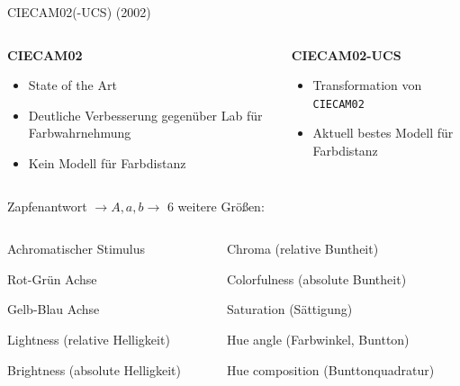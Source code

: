 \documentclass[aspectratio=1610, 9pt]{beamer}
\begin{document}
\begin{frame}[c]{CIECAM02(-UCS) (2002)}
  \begin{columns}[t, onlytextwidth]%
    \begin{column}{0.45\textwidth}%
      \textbf{\Large CIECAM02}

      \begin{itemize}
        \item State of the Art
        \item Deutliche Verbesserung gegenüber Lab für Farbwahrnehmung
        \item Kein Modell für Farbdistanz
      \end{itemize}
    \end{column}
    \begin{column}{0.45\textwidth}%
      \textbf{\Large CIECAM02-UCS}
      \begin{itemize}
        \item Transformation von \texttt{CIECAM02}  
        \item Aktuell bestes Modell für Farbdistanz
      \end{itemize}
    \end{column}
  \end{columns}

  \vspace{1cm}
  Zapfenantwort ${}→ A, a,b → {}$ 6 weitere Größen:

  \begin{columns}[t, onlytextwidth]%
    \begin{column}{0.45\textwidth}%
      \begin{description}[$M$]
        \item[$A$] Achromatischer Stimulus 
        \item[$a$] Rot-Grün Achse
        \item[$b$] Gelb-Blau Achse\\[\baselineskip]
        \item[$J$] Lightness (relative Helligkeit)
        \item[$Q$] Brightness (absolute Helligkeit) 
      \end{description}
    \end{column}
    \begin{column}{0.45\textwidth}%
      \begin{description}[$M$]
        \item[$C$] Chroma (relative Buntheit)
        \item[$M$] Colorfulness (absolute Buntheit)
        \item[$s$] Saturation (Sättigung) \\[\baselineskip]
        \item[$h$] Hue angle (Farbwinkel, Buntton)
        \item[$H$] Hue composition (Bunttonquadratur)
      \end{description}
    \end{column}
  \end{columns}
\end{frame}
\end{document}
